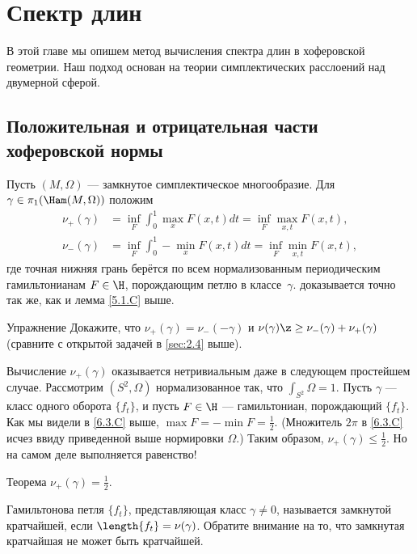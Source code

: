 \chapter{Спектр длин}

В этой главе мы опишем метод вычисления спектра длин в хоферовской геометрии.
Наш подход основан на теории симплектических расслоений над двумерной сферой.

\section{Положительная и отрицательная части хоферовской нормы}

Пусть $(M, \Omega)$ --- замкнутое симплектическое многообразие.
Для $\gamma \in \pi_1 (\Ham(M, \Omega))$ положим 
\begin{align*}
\nu_+ (\gamma) &= \inf_F \int_0^1 \max_x F (x, t)dt = \inf_F \max_{x,t}F (x, t),
\\ 
\nu_- (\gamma) &= \inf_F \int_0^1 -\min_x F (x, t)dt = \inf_F \min_{x,t}F (x, t),
\end{align*}
где точная нижняя грань берётся по всем нормализованным периодическим гамильтонианам $F \in \H$, порождающим петлю в классе~$\gamma$.
 доказывается точно так же, как и лемма \ref{5.1.C} выше.

\begin{thm*}{Упражнение}
Докажите, что $\nu_+ (\gamma) = \nu_- (-\gamma)$ и $\nu(\gamma) \z\ge \nu_- (\gamma) + \nu_+ (\gamma)$
(сравните с открытой задачей в \ref{sec:2.4} выше).
\end{thm*}

Вычисление $\nu_+ (\gamma)$ оказывается нетривиальным даже в следующем простейшем случае.
Рассмотрим $(S^2, \Omega)$ нормализованное так, что $\int_{S^2} \Omega = 1$.
Пусть $\gamma$ --- класс одного оборота $\{f_t\}$, и пусть $F \in \H$ --- гамильтониан, порождающий $\{f_t\}$.
Как мы видели в \ref{6.3.C} выше,  $\max F = - \min F = \frac12$.
(Множитель $2\pi$ в \ref{6.3.C} исчез ввиду приведенной выше нормировки $\Omega$.)
Таким образом, $\nu_+ (\gamma) \le \frac12$.
Но на самом деле выполняется равенство!

\begin{thm}{Теорема}\label{9.1.A}
$\nu_+ (\gamma) = \frac12$.
\end{thm}

Гамильтонова петля $\{f_t \}$, представляющая класс $\gamma \ne 0$, называется замкнутой кратчайшей, если $\length\{f_t \} = \nu(\gamma)$.
Обратите внимание на то, что замкнутая кратчайшая не может быть кратчайшей.

